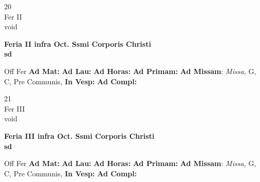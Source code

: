 \documentclass[10pt, openany]{book}
\begin{document}
    \begin{center}
        \begin{minipage}{3.5in}
            \vspace{2em}
            \begin{minipage}{0.5in}
                {\Huge 20} \\
                {\normalsize Fer II} \\
                {\normalsize void}
            \end{minipage}
            \begin{minipage}{3.0in}
                \textbf{ \large Feria II infra Oct. Ssmi Corporis Christi \\
                \textnormal{\normalsize sd}} \\ 
            \end{minipage}
            \begin{justify}Off Fer
                \textbf{Ad Mat: }
                \textbf{Ad Lau: }
                \textbf{Ad Horas: }
                \textbf{Ad Primam: }\textbf{Ad Missam}: \textit{Missa,} G, C, Pre Communis,  
                \textbf{In Vesp: }
                \textbf{Ad Compl: }
            \end{justify}
        \end{minipage}
    \end{center}

    \begin{center}
        \begin{minipage}{3.5in}
            \vspace{2em}
            \begin{minipage}{0.5in}
                {\Huge 21} \\
                {\normalsize Fer III} \\
                {\normalsize void}
            \end{minipage}
            \begin{minipage}{3.0in}
                \textbf{ \large Feria III infra Oct. Ssmi Corporis Christi \\
                \textnormal{\normalsize sd}} \\ 
            \end{minipage}
            \begin{justify}Off Fer
                \textbf{Ad Mat: }
                \textbf{Ad Lau: }
                \textbf{Ad Horas: }
                \textbf{Ad Primam: }\textbf{Ad Missam}: \textit{Missa,} G, C, Pre Communis,  
                \textbf{In Vesp: }
                \textbf{Ad Compl: }
            \end{justify}
        \end{minipage}
    \end{center}
\end{document}

